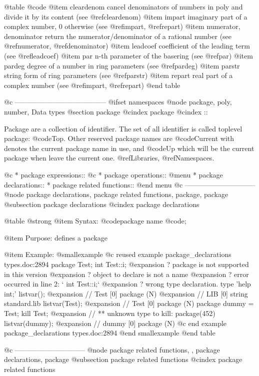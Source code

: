 {{{{{{@table @code
@item cleardenom
cancel denominators of numbers in poly and divide it by its content
(see @ref{cleardenom})
@item impart
imaginary part of a complex number, 0 otherwise
(see @ref{impart}, @ref{repart})
@item numerator, denominator
return the numerator/denominator of a rational number
(see @ref{numerator}, @ref{denominator})
@item leadcoef
coefficient of the leading term (see @ref{leadcoef})
@item par
n-th parameter of the basering (see @ref{par})
@item pardeg
degree of a number in ring parameters (see @ref{pardeg})
@item parstr
string form of ring parameters (see @ref{parstr})
@item repart
real part of a complex number
(see @ref{impart}, @ref{repart})
@end table

@c ---------------------------------------
@ifset namespaces
@node package, poly, number, Data types
@section package
@cindex package
@cindex ::

Package are a collection of identifier.
The set of all identifier is called toplevel package: @code{Top}.
Other reserved package names are @code{Current} with denotes the current
package name in use, and @code{Up} which will be the current package
when leave the current one.
@ref{Libraries}, @ref{Namespaces}.

@c * package expressions::
@c * package operations::
@menu
* package declarations::
* package related functions::
@end menu
@c ------------------------------
@node package declarations, package related functions, package, package
@subsection package declarations
@cindex package declarations

@table @strong
@item Syntax:
@code{package} name @code{;}

@item Purpose:
defines a package

@item Example:
@smallexample
@c reused example package_declarations types.doc:2894 
  package Test;
  int Test::i;
@expansion{}    ? package is not supported in this version
@expansion{}    ? object to declare is not a name
@expansion{}    ? error occurred in line 2: `  int Test::i;`
@expansion{}    ? wrong type declaration. type 'help int;'
  listvar();
@expansion{} // Test                 [0]  package (N)
@expansion{} // LIB                  [0]  string standard.lib
  listvar(Test);
@expansion{} // Test                 [0]  package (N)
  package dummy = Test;
  kill Test;
@expansion{} // ** unknown type to kill: package(452)
  listvar(dummy);
@expansion{} // dummy                [0]  package (N)
@c end example package_declarations types.doc:2894
@end smallexample
@end table

@c ------------------------------
@node package related functions,  , package declarations, package
@subsection package related functions
@cindex package related functions

}}}}}}
